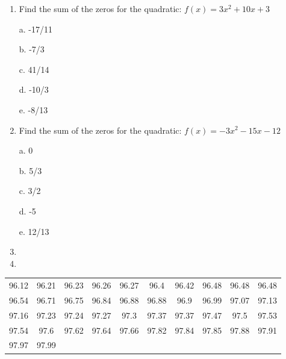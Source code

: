 \documentclass{article}
\begin{document}
\begin{enumerate}

    \item Find the sum of the zeros for the quadratic: $f(x)=3 x^{2} + 10 x + 3$


\begin{minipage}[t]{.2\textwidth}
    a. -17/11
\end{minipage}
\begin{minipage}[t]{.2\textwidth}
    b. -7/3
\end{minipage}
\begin{minipage}[t]{.2\textwidth}
    c. 41/14
\end{minipage}
\begin{minipage}[t]{.2\textwidth}
    d. -10/3
\end{minipage}
\begin{minipage}[t]{.2\textwidth}
    e. -8/13
\end{minipage}



    \item Find the sum of the zeros for the quadratic: $f(x)=- 3 x^{2} - 15 x - 12$


\begin{minipage}[t]{.2\textwidth}
    a. 0
\end{minipage}
\begin{minipage}[t]{.2\textwidth}
    b. 5/3
\end{minipage}
\begin{minipage}[t]{.2\textwidth}
    c. 3/2
\end{minipage}
\begin{minipage}[t]{.2\textwidth}
    d. -5
\end{minipage}
\begin{minipage}[t]{.2\textwidth}
    e. 12/13
\end{minipage}



    \item 

    \item 

    

\end{enumerate}

 \begin{tabular}{|cccccccccc|}\hline 96.12&96.21&96.23&96.26&96.27&96.4&96.42&96.48&96.48&96.48\\ 96.54&96.71&96.75&96.84&96.88&96.88&96.9&96.99&97.07&97.13\\ 97.16&97.23&97.24&97.27&97.3&97.37&97.37&97.47&97.5&97.53\\ 97.54&97.6&97.62&97.64&97.66&97.82&97.84&97.85&97.88&97.91\\ 97.97&97.99&&&&&&&&\\\hline\end{tabular}
\end{document}
